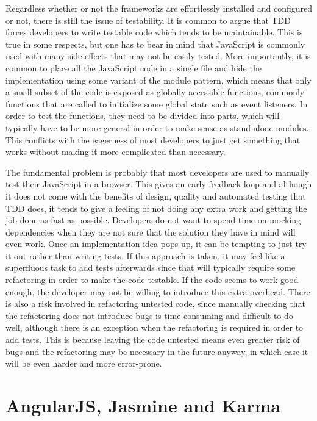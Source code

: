 \documentclass[11pt]{article}
\begin{document}
Regardless whether or not the frameworks are effortlessly installed and configured or not, there is still the issue of testability. It is common to argue that TDD forces developers to write testable code which tends to be maintainable. This is true in some respects, but one has to bear in mind that JavaScript is commonly used with many side-effects that may not be easily tested. More importantly, it is common to place all the JavaScript code in a single file and hide the implementation using some variant of the module pattern\cite[p.~40]{GoodParts}, which means that only a small subset of the code is exposed as globally accessible functions, commonly functions that are called to initialize some global state such as event listeners. In order to test the functions, they need to be divided into parts, which will typically have to be more general in order to make sense as stand-alone modules. This conflicts with the eagerness of most developers to just get something that works without making it more complicated than necessary.

The fundamental problem is probably that most developers are used to manually test their JavaScript in a browser. This gives an early feedback loop and although it does not come with the benefits of design, quality and automated testing that TDD does, it tends to give a feeling of not doing any extra work and getting the job done as fast as possible. Developers do not want to spend time on mocking dependencies when they are not sure that the solution they have in mind will even work. Once an implementation idea pops up, it can be tempting to just try it out rather than writing tests. If this approach is taken, it may feel like a superfluous task to add tests afterwards since that will typically require some refactoring in order to make the code testable. If the code seems to work good enough, the developer may not be willing to introduce this extra overhead. There is also a risk involved in refactoring untested code\cite[p.~17]{Refactoring}, since manually checking that the refactoring does not introduce bugs is time consuming and difficult to do well, although there is an exception when the refactoring is required in order to add tests. This is because leaving the code untested means even greater risk of bugs and the refactoring may be necessary in the future anyway, in which case it will be even harder and more error-prone.

\section{AngularJS, Jasmine and Karma}
\end{document}
